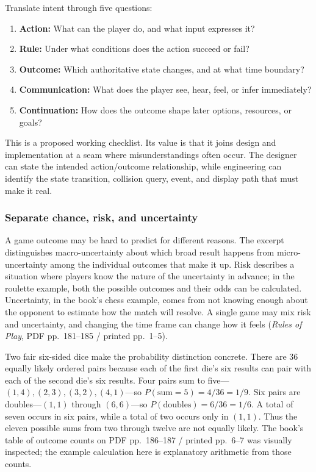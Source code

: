 Translate intent through five questions:

\begin{enumerate}
\def\labelenumi{\arabic{enumi}.}
\tightlist
\item
  \textbf{Action:} What can the player do, and what input expresses it?
\item
  \textbf{Rule:} Under what conditions does the action succeed or fail?
\item
  \textbf{Outcome:} Which authoritative state changes, and at what time boundary?
\item
  \textbf{Communication:} What does the player see, hear, feel, or infer immediately?
\item
  \textbf{Continuation:} How does the outcome shape later options, resources, or goals?
\end{enumerate}

This is a proposed working checklist. Its value is that it joins design and implementation at a seam where misunderstandings often occur. The designer can state the intended action/outcome relationship, while engineering can identify the state transition, collision query, event, and display path that must make it real.

\subsubsection{Separate chance, risk, and uncertainty}\label{05-engine-i-ch009-separate-chance-risk-and-uncertainty}

A game outcome may be hard to predict for different reasons. The excerpt distinguishes macro-uncertainty about which broad result happens from micro-uncertainty among the individual outcomes that make it up. Risk describes a situation where players know the nature of the uncertainty in advance; in the roulette example, both the possible outcomes and their odds can be calculated. Uncertainty, in the book's chess example, comes from not knowing enough about the opponent to estimate how the match will resolve. A single game may mix risk and uncertainty, and changing the time frame can change how it feels (\emph{Rules of Play}, PDF pp.~181--185 / printed pp.~1--5).

Two fair six-sided dice make the probability distinction concrete. There are 36 equally likely ordered pairs because each of the first die's six results can pair with each of the second die's six results. Four pairs sum to five---\((1,4),(2,3),(3,2),(4,1)\)---so \(P(\text{sum}=5)=4/36=1/9\). Six pairs are doubles---\((1,1)\) through \((6,6)\)---so \(P(\text{doubles})=6/36=1/6\). A total of seven occurs in six pairs, while a total of two occurs only in \((1,1)\). Thus the eleven possible sums from two through twelve are not equally likely. The book's table of outcome counts on PDF pp.~186--187 / printed pp.~6--7 was visually inspected; the example calculation here is explanatory arithmetic from those counts.

